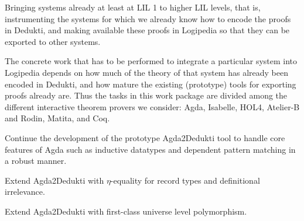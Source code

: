 \begin{workpackage}[id=instrumentation,type=RTD,wphases=1-48,
  short=Integration,%
  title=Integration,
  activity=na,
  lead=Del,
  DelRM=16,
  GotRM=4,
  TumRM=5,
  ChaRM=16,
  CleRM=14,
  ImtRM=1,
  TouRM=11,
  BolRM=16, %
  InrRM=6]

\begin{wpobjectives}
  Bringing systems already at least at
  LIL 1 to higher LIL levels, that is, instrumenting the systems
  for which we already know how to encode the proofs in Dedukti, and
  making available these proofs in Logipedia so that
  they can be exported to other systems.
\end{wpobjectives}

\begin{wpdescription}
  The concrete work that has to be performed to integrate a particular
  system into Logipedia depends on how much of the theory of that
  system has already been encoded in Dedukti, and how mature the
  existing (prototype) tools for exporting proofs already are. Thus
  the tasks in this work package are divided among the different
  interactive theorem provers we consider: Agda, Isabelle, HOL4,
  Atelier-B and Rodin, Matita, and Coq.
\end{wpdescription}

\begin{tasklist}
\begin{task}[id=agda,
  title=Instrument Agda,
  shorttitle=Agda,
  lead=Del,
  DelRM=14,
  GotRM=4,
  wphases=1-18]
% 
\vspace{-5mm}
\begin{compactitem}
\item Continue the development of the prototype Agda2Dedukti tool to
handle core features of Agda such as inductive datatypes and dependent
pattern matching in a robust manner.
\item Extend Agda2Dedukti with $\eta$-equality for record types and definitional irrelevance.
\item Extend Agda2Dedukti with first-class universe level polymorphism.
\end{compactitem}
\end{task}


\end{tasklist}
\end{workpackage}
